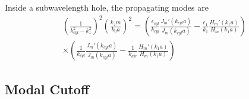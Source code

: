 \documentclass[12pt]{article}
\numberwithin{equation}{section}
\begin{document}
%
%
%
%
%
%
%
%
%


Inside a subwavelength hole, the propagating modes are 
\cite{Catrysse:08}
\begin{equation}
\begin{aligned}
\left ( \frac{1}{k_{cyl}^2 - k_1^2} \right ) ^2 \left ( \frac{k_z m}{k_0 a} \right )^2 = \left ( \frac{\epsilon_{cyl}}{k_{cyl}} \frac{J_m' (k_{cyl} a )}{J_m (k_{cyl} a )} - \frac{\epsilon_1}{k_{1}} \frac{H_m' (k_1 a)}{H_m (k_1 a )} \right ) 
\\ \times 
\left ( \frac{1}{k_{cyl}} \frac{J_m' (k_{cyl} a )}{J_m (k_{cyl} a )} - \frac{1}{k_{air}} \frac{H_m' (k_1 a)}{H_m (k_1 a )} \right ) 
\end{aligned}
\end{equation}





\subsection{Modal Cutoff}
\end{document}
